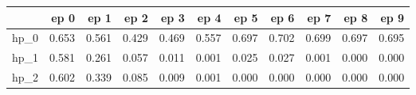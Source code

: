 \begin{tabular}{lrrrrrrrrrr}
\toprule
{} &   ep 0 &   ep 1 &   ep 2 &   ep 3 &   ep 4 &   ep 5 &   ep 6 &   ep 7 &   ep 8 &   ep 9 \\
\midrule
hp\_0 &  0.653 &  0.561 &  0.429 &  0.469 &  0.557 &  0.697 &  0.702 &  0.699 &  0.697 &  0.695 \\
hp\_1 &  0.581 &  0.261 &  0.057 &  0.011 &  0.001 &  0.025 &  0.027 &  0.001 &  0.000 &  0.000 \\
hp\_2 &  0.602 &  0.339 &  0.085 &  0.009 &  0.001 &  0.000 &  0.000 &  0.000 &  0.000 &  0.000 \\
\bottomrule
\end{tabular}
